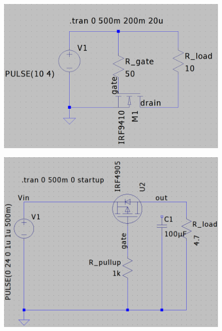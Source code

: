 \documentclass[main.tex]{subfiles}
\begin{document}
    \begin{figure}[!h]
        \centering
        \begin{minipage}{.4\textwidth}
          \centering
          \includegraphics[width=\linewidth]{media/nmos_switch.png}
          \label{fig:simple_nmos_switch}
        \end{minipage}\qquad
        \begin{minipage}{.4\textwidth}
          \centering
          \includegraphics[width=\linewidth]{media/pmos_switch.png}
          \label{fig:simple_pmos_switch}
        \end{minipage}
    \end{figure}
\end{document}
